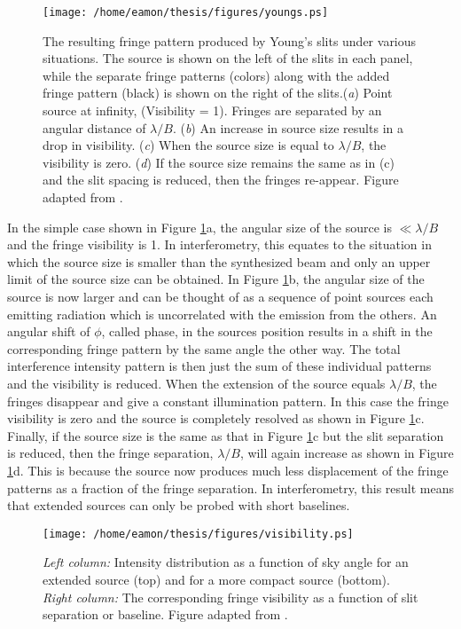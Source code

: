 \begin{figure}[hbt!]
\centering 
          \texttt{[image: /home/eamon/thesis/figures/youngs.ps]}
\caption[Fringe pattern produced by Young's slits under various situations.]{The resulting fringe pattern produced by Young's slits under various situations. The source is shown on the left of the slits in each panel, while the separate fringe patterns (colors) along with the added fringe pattern (black) is shown on the right of the slits.(\textit{a}) Point source at infinity, (Visibility = 1). Fringes are separated by an angular distance of $\lambda /B$. (\textit{b}) An increase in source size results in a drop in visibility. (\textit{c}) When the source size is equal to $\lambda /B$, the visibility is zero. (\textit{d}) If the source size remains the same as in (c) and the slit spacing is reduced, then the fringes re-appear. Figure adapted from \cite{jackson_2008}.}
\label{fig2e}
\end{figure}

In the simple case shown in Figure \ref{fig2e}a, the angular size of the source is  $\ll \lambda/B$ and the fringe visibility is 1. In interferometry, this equates to the situation in which the source size is smaller than the synthesized beam and only an upper limit of the source size can be obtained. In Figure \ref{fig2e}b, the angular size of the source is now larger and can be thought of as a sequence of point sources each emitting radiation which is uncorrelated with the emission from the others. An angular shift of $\phi$, called phase, in the sources position results in a shift in the corresponding fringe pattern by the same angle the other way. The total interference intensity pattern is then just the sum of these individual patterns and the visibility is reduced. When the extension of the source equals $\lambda/B$, the fringes disappear and give a constant illumination pattern. In this case the fringe visibility is zero and the source is completely resolved as shown in Figure \ref{fig2e}c. Finally, if the source size is the same as that in Figure \ref{fig2e}c but the slit separation is reduced, then the fringe separation, $\lambda/B$, will again increase as shown in Figure \ref{fig2e}d. This is because the source now produces much less displacement of the fringe patterns as a fraction of the fringe separation. In interferometry, this result means that extended sources can only be probed with short baselines. 

\begin{figure}[hbt!]
\centering 
          \texttt{[image: /home/eamon/thesis/figures/visibility.ps]}
\caption[Visibilities for various source sizes.]{\textit{Left column:} Intensity distribution as a function of sky angle for an extended source (top) and for a more compact source (bottom). \textit{Right column:} The corresponding fringe visibility as a function of slit separation or baseline. Figure adapted from \cite{jackson_2008}.}
\label{fig2f}
\end{figure}

